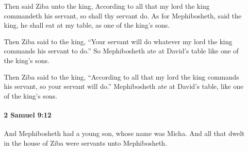 			\begin{versebox}
					\item[BHS] 
					\item[ASV] Then said Ziba unto the king, According to all that my lord the king commandeth his servant, so shall thy servant do. As for Mephibosheth, said the king, he shall eat at my table, as one of the king's sons.
					\item[NIV] Then Ziba said to the king, “Your servant will do whatever my lord the king commands his servant to do.” So Mephibosheth ate at David’s table like one of the king’s sons.
					\item[NRSV] Then Ziba said to the king, “According to all that my lord the king commands his servant, so your servant will do.” Mephibosheth ate at David’s table, like one of the king’s sons.
			\end{versebox}

		\paragraph{2 Samuel 9:12} %
			\label{2SAMUEL-9-12}

			And Mephibosheth had a young son, whose name was Micha. And all that dwelt in the house of Ziba were servants unto Mephibosheth.

